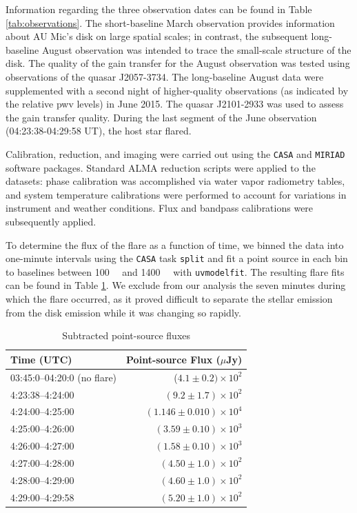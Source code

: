 \documentclass[12pt,oneside]{book}
\begin{document}
Information regarding the three observation dates can be found in Table \ref{tab:observations}. 
The short-baseline March observation provides information about AU Mic's disk on large spatial scales; in contrast, the subsequent long-baseline August observation was intended to trace the small-scale structure of the disk. 
The quality of the gain transfer for the August observation was tested using observations of the quasar J2057-3734.
The long-baseline August data were supplemented with a second night of higher-quality observations (as indicated by the relative pwv levels) in June 2015.
The quasar J2101-2933 was used to assess the gain transfer quality.
During the last segment of the June observation (04:23:38-04:29:58 UT), the host star flared. 

Calibration, reduction, and imaging were carried out using the \texttt{CASA} and \texttt{MIRIAD} software packages. Standard ALMA reduction scripts were applied to the datasets: phase calibration was accomplished via water vapor radiometry tables, and system temperature calibrations were performed to account for variations in instrument and weather conditions. 
Flux and bandpass calibrations were subsequently applied.

To determine the flux of the flare as a function of time, we binned the data into one-minute intervals using the \texttt{CASA} task \texttt{split} and fit a point source in each bin to baselines between \SI{100}{\kilo \lambda} and \SI{1400}{\kilo \lambda} with \texttt{uvmodelfit}. 
The resulting flare fits can be found in Table \ref{tab:flare fluxes}. 
We exclude from our analysis the seven minutes during which the flare occurred, as it proved difficult to separate the stellar emission from the disk emission while it was changing so rapidly.

\begin{table}	
  \centering
	\caption{Subtracted point-source fluxes}
  \label{tab:flare fluxes}
  \begin{tabular}{lr}
    \toprule
    Time (UTC) & Point-source Flux ($\mu$Jy) \\
    \midrule
    03:45:0--04:20:0 (no flare) & ($4.1 \pm 0.2)  \times 10^2$\\
  	4:23:38--4:24:00 & $(9.2 \pm 1.7) \times 10^2$ \\
  	4:24:00--4:25:00 & $(1.146 \pm 0.010) \times 10^4$ \\
  	4:25:00--4:26:00 & $(3.59 \pm 0.10) \times 10^3$ \\
  	4:26:00--4:27:00 & $(1.58 \pm 0.10) \times 10^3$ \\
  	4:27:00--4:28:00 & $(4.50 \pm 1.0) \times 10^2$ \\
  	4:28:00--4:29:00 & $(4.60 \pm 1.0) \times 10^2$ \\
  	4:29:00--4:29:58 & $(5.20 \pm 1.0) \times 10^2$\\
    \bottomrule
  \end{tabular}
\end{table}
\end{document}

